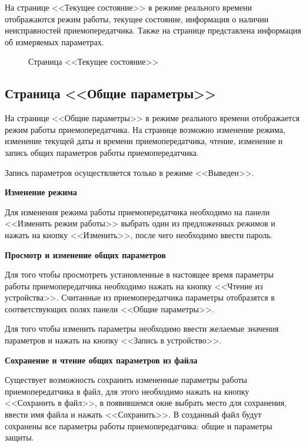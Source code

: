 На странице <<Текущее состояние>> в режиме реального времени отображаются режим работы, текущее состояние, информация о наличии неисправностей приемопередатчика. Также на странице представлена информация об измеряемых параметрах.

\begin{figure}[H]
	
	\caption{Страница <<Текущее состояние>>}
	\label{fig:configurator_state}
\end{figure}


\subsection{Страница <<Общие параметры>>}	\label{ssec:configurator_param_glb}

На странице <<Общие параметры>> в режиме реального времени отображается режим работы приемопередатчика. На странице возможно изменение режима, изменение текущей даты и времени приемопередатчика, чтение, изменение и запись общих параметров работы приемопередатчика.

Запись параметров осуществляется только в режиме <<Выведен>>. 
\newline

\textbf{Изменение режима}

Для изменения режима работы приемопередатчика необходимо на панели <<Изменить режим работы>> выбрать один из предложенных режимов и нажать на кнопку <<Изменить>>, после чего необходимо ввести пароль.
\newline

\textbf{Просмотр и изменение общих параметров}

Для того чтобы просмотреть установленные в настоящее время параметры работы приемопередатчика необходимо нажать на кнопку <<Чтение из устройства>>. Считанные из приемопередатчика параметры отобразятся в соответствующих полях панели <<Общие параметры>>.

Для того чтобы изменить параметры необходимо ввести желаемые значения параметров и нажать на кнопку <<Запись в устройство>>.
\newline

\textbf{Сохранение и чтение общих параметров из файла}

Существует возможность сохранить измененные параметры работы приемопередатчика в файл, для этого необходимо нажать на кнопку <<Сохранить в файл>>, в появившемся окне выбрать место для сохранения, ввести имя файла и нажать <<Сохранить>>. В созданный файл будут сохранены все параметры работы приемопередатчика: общие и параметры защиты.


